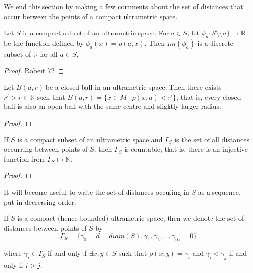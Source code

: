 We end this section by making a few comments about the set of distances that occur between the points of a compact ultrametric space.\\

\begin{proposition}
\cite{ar} Let $S$ is a compact subset of an ultrametric space. For $a \in S$, let $\phi_a: S \setminus \{a\} \rightarrow \mathbb{R}$ be the function defined by $\phi_a(x)=\rho(a,x)$. Then $Im(\phi_a)$ is a discrete subset of $\mathbb{R}$ for all $a \in S$.
\end{proposition}

\begin{proof}
Robert 72
\end{proof}


\begin{corollary}
\cite{ar} Let $B(a, r)$ be a closed ball in an ultrametric space. Then there exists $ r' > r \in \mathbb{R}$ such that $B(a, r) = \{x \in M \mid \rho(x,a) < r'\} $; that is, every closed ball is also an open ball with the same centre and  slightly larger radius.
\end{corollary}

\begin{proof}
\end{proof}

\begin{corollary}
\cite{ar} If $S$ is a compact subset of an ultrametric space and $\Gamma_S$ is the set of all distances occurring between points of $S$, then $\Gamma_S$ is countable; that is, there is an injective function from $\Gamma_S \mapsto \mathbb{N}$.
\end{corollary}

\begin{proof}
\end{proof}

It will become useful to write the set of distances occuring in $S$ as a sequence, put in decreasing order. 

\begin{notation*}
If $S$ is a compact (hence bounded) ultrametric space, then we denote the set of distances between points of $S$ by 
$$\Gamma_S = \{\gamma_0 = d =diam(S), \gamma_1, \gamma_2, \ldots, \gamma_\infty =0 \}$$

where $\gamma_i \in  \Gamma_S$ if and only if $\exists x,y \in S$ such that $\rho(x,y) = \gamma_i$ and  $\gamma_i < \gamma_j$ if and only if $i > j$. 
\end{notation*}

